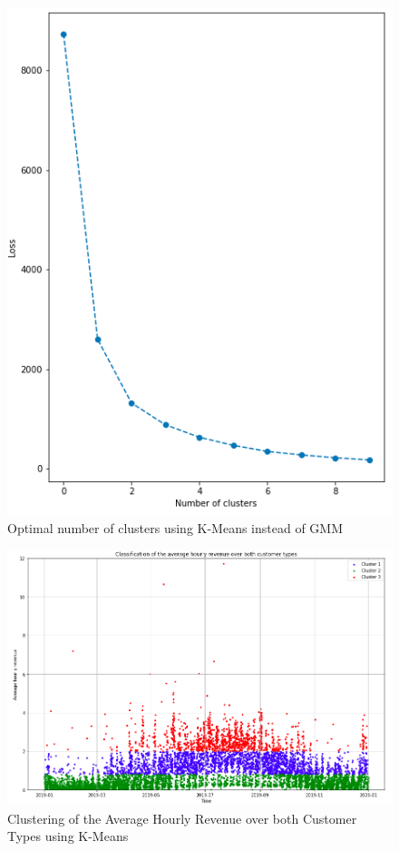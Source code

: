 \begin{figure}[H]
   \centering
    \includegraphics[width=0.8\linewidth]{./Figures/BC_APP1.png}
    \caption{Optimal number of clusters using K-Means instead of GMM}
    \label{BCAPP1}
\end{figure}

\begin{figure}[H]
   \centering
    \includegraphics[width=0.8\linewidth]{./Figures/BC_APP2.png}
    \caption{Clustering of the Average Hourly Revenue over both Customer Types using K-Means}
    \label{BCAPP2}
\end{figure}

